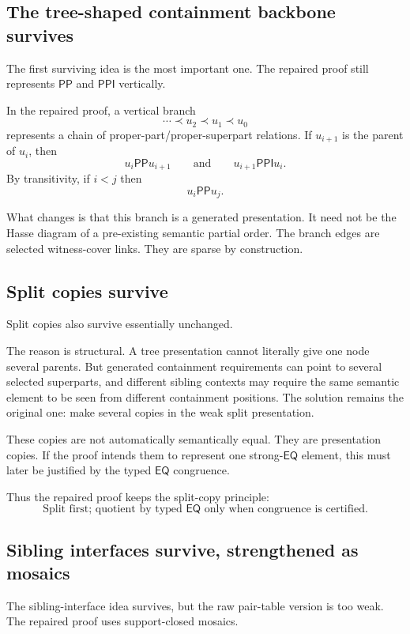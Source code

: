 \documentclass[11pt]{article}
\newcommand{\PP}{\mathsf{PP}}
\newcommand{\PPI}{\mathsf{PPI}}
\newcommand{\EQ}{\mathsf{EQ}}
\theoremstyle{definition}
\theoremstyle{plain}
\begin{document}
\subsection{The tree-shaped containment backbone survives}

The first surviving idea is the most important one.  The repaired proof still represents $\PP$ and $\PPI$ vertically.

In the repaired proof, a vertical branch
\[
\cdots \prec u_2 \prec u_1 \prec u_0
\]
represents a chain of proper-part/proper-superpart relations.  If $u_{i+1}$ is the parent of $u_i$, then
\[
u_i \PP u_{i+1}
\qquad\text{and}\qquad
u_{i+1}\PPI u_i.
\]
By transitivity, if $i<j$ then
\[
u_i\PP u_j.
\]

What changes is that this branch is a generated presentation.  It need not be the Hasse diagram of a pre-existing semantic partial order.  The branch edges are selected witness-cover links.  They are sparse by construction.

\subsection{Split copies survive}

Split copies also survive essentially unchanged.

The reason is structural.  A tree presentation cannot literally give one node several parents.  But generated containment requirements can point to several selected superparts, and different sibling contexts may require the same semantic element to be seen from different containment positions.  The solution remains the original one: make several copies in the weak split presentation.

These copies are not automatically semantically equal.  They are presentation copies.  If the proof intends them to represent one strong-$\EQ$ element, this must later be justified by the typed $\EQ$ congruence.

Thus the repaired proof keeps the split-copy principle:
\[
\boxed{\text{Split first; quotient by typed }\EQ\text{ only when congruence is certified.}}
\]

\subsection{Sibling interfaces survive, strengthened as mosaics}

The sibling-interface idea survives, but the raw pair-table version is too weak.  The repaired proof uses support-closed mosaics.
\end{document}
